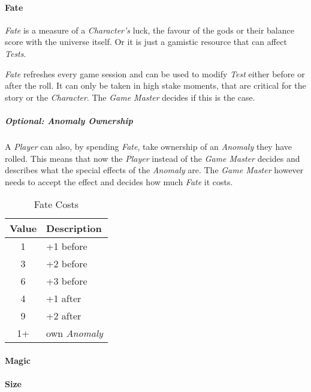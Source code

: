 \paragraph{Fate}

\emph{Fate} is a measure of a \emph{Character's} luck, the favour of the gods or their
balance score with the universe itself. Or it is just a gamistic resource that can
affect \emph{Tests}.

\emph{Fate} refreshes every game session and can be used to modify \emph{Test} either
before or after the roll. It can only be taken in high stake moments, that are critical
for the story or the \emph{Character}. The \emph{Game Master} decides if this is the case.

\subparagraph{Optional: Anomaly Ownership}
A \emph{Player} can also, by spending \emph{Fate}, take ownership of an \emph{Anomaly}
they have rolled. This means that now the \emph{Player} instead of the
\emph{Game Master} decides and describes what the special effects of the \emph{Anomaly} are.
The \emph{Game Master} however needs to accept the effect and decides how much
\emph{Fate} it costs.
\begin{table}[htb]
    \caption[Fate Costs]{Fate Costs}
    \label{tab:fate costs}
    \centering
    \begin{tabular}{cl}
        \toprule
        \textbf{Value} & \textbf{Description} \\
        \midrule
        1              & +1 before            \\
        3              & +2 before            \\
        6              & +3 before            \\
        4              & +1 after             \\
        9              & +2 after             \\
        1+             & own \emph{Anomaly}   \\
        \bottomrule
    \end{tabular}
\end{table}

\paragraph{Magic}

\paragraph{Size}

